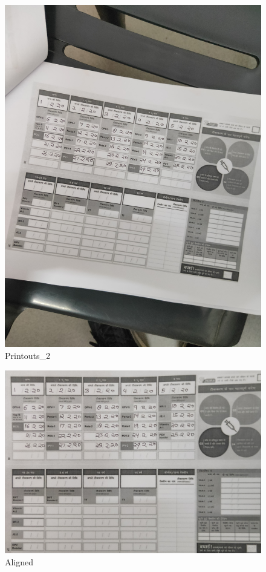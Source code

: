 \documentclass{article}
\begin{document}
\pagebreak
    \begin{figure}[!htb]
    \minipage{\textwidth}
    \begin{center}
      \includegraphics[scale=.065]{4/.report/_orig/p2.jpg}
      \caption{Printouts_2}
    \end{center}
    \endminipage
    \end{figure}
    \begin{figure}[!htb]
    \minipage{\textwidth}
    \begin{center}
      \includegraphics[scale=.2]{4/.report/_aligned/p2.jpg}
      \caption{Aligned}
    \end{center}
    \endminipage
    \end{figure}
\end{document}
